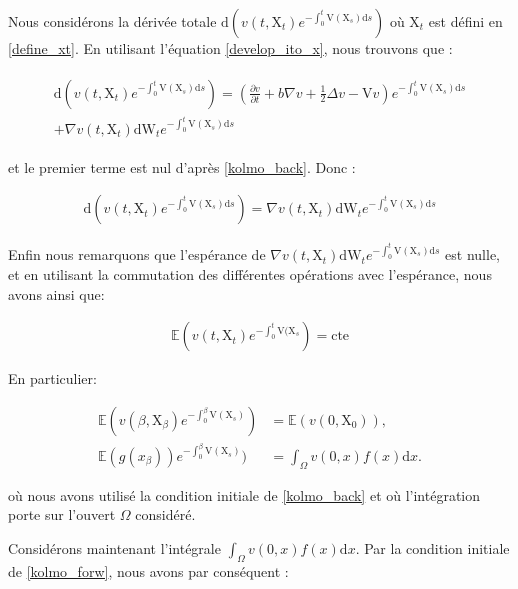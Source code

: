 \documentclass[11pt]{article}
\theoremstyle{definition}
\theoremstyle{remark}
\begin{document}
Nous considérons la dérivée totale $\mathrm{d}(v(t, \mathrm{X}_{t}) e^{-\int_0^{t} \mathrm{V}(\mathrm{X}_{s}) \mathrm{d}s})$ où $\mathrm{X}_{t}$ est défini en \eqref{define_xt}. En utilisant l'équation \eqref{develop_ito_x}, nous trouvons que :

\begin{multline}
\begin{split}
\mathrm{d}(v(t, \mathrm{X}_{t}) e^{-\int_0^{t} \mathrm{V}(\mathrm{X}_{s}) \mathrm{d}s}) = (\frac{\partial v}{\partial t} + b \nabla v + \frac{1}{2}\Delta v - \mathrm{V}v)e^{-\int_0^{t} \mathrm{V}(\mathrm{X}_{s}) \mathrm{d}s} \\
+ \nabla v(t, \mathrm{X}_t)\mathrm{dW}_{t} e^{-\int_0^{t} \mathrm{V}(\mathrm{X}_{s}) \mathrm{d}s}
\end{split}
\end{multline}

et le premier terme est nul d'après \eqref{kolmo_back}. Donc :

\begin{align}
\mathrm{d}(v(t, \mathrm{X}_{t}) e^{-\int_0^{t} \mathrm{V}(\mathrm{X}_{s}) \mathrm{d}s}) = \nabla v(t, \mathrm{X}_t)\mathrm{dW}_{t} e^{-\int_0^{t} \mathrm{V}(\mathrm{X}_{s}) \mathrm{d}s}
\end{align}

Enfin nous remarquons que l’espérance de $\nabla v(t, \mathrm{X}_t)\mathrm{dW}_{t} e^{-\int_0^{t} \mathrm{V}(\mathrm{X}_{s}) \mathrm{d}s}$ est nulle, et en utilisant la commutation des différentes opérations avec l’espérance, nous avons ainsi que: 

\begin{align}
\mathbb{E}(v(t , \mathrm{X}_{t})e^{-\int_0^{t} \mathrm{V}(\mathrm{X}_{s}}) = \mathrm{cte}
\end{align}

En particulier:

\begin{align}
\mathbb{E}(v(\beta , \mathrm{X}_{\beta})e^{-\int_0^{\beta} \mathrm{V}(\mathrm{X}_{s})}) &= \mathbb{E}(v(0, \mathrm{X}_0)), \\
\mathbb{E}(g(x_{\beta}))e^{-\int_0^{\beta} \mathrm{V}(\mathrm{X}_{s})}) &= \int_{\Omega} v(0,x) f(x) \mathrm{d}x.
\end{align}

où nous avons utilisé la condition initiale de \eqref{kolmo_back} et où l’intégration porte sur l'ouvert $\Omega$ considéré. 

Considérons maintenant l'intégrale $\int_{\Omega} v(0,x) f(x) \mathrm{d}x$. Par la condition initiale de \eqref{kolmo_forw}, nous avons par conséquent :
\end{document}
